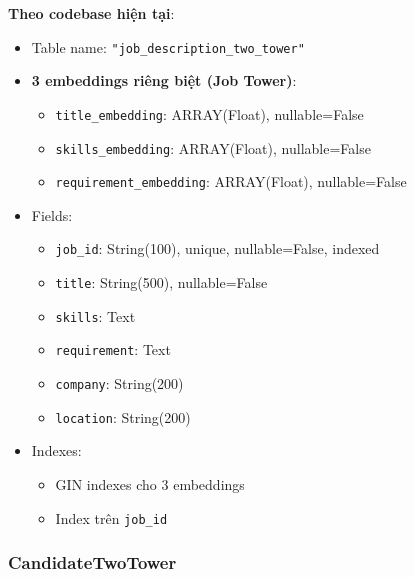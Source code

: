 \textbf{Theo codebase hiện tại}:
\begin{itemize}
    \item Table name: \texttt{"job\_description\_two\_tower"}
    \item \textbf{3 embeddings riêng biệt (Job Tower)}:
    \begin{itemize}
        \item \texttt{title\_embedding}: ARRAY(Float), nullable=False
        \item \texttt{skills\_embedding}: ARRAY(Float), nullable=False
        \item \texttt{requirement\_embedding}: ARRAY(Float), nullable=False
    \end{itemize}
    \item Fields:
    \begin{itemize}
        \item \texttt{job\_id}: String(100), unique, nullable=False, indexed
        \item \texttt{title}: String(500), nullable=False
        \item \texttt{skills}: Text
        \item \texttt{requirement}: Text
        \item \texttt{company}: String(200)
        \item \texttt{location}: String(200)
    \end{itemize}
    \item Indexes:
    \begin{itemize}
        \item GIN indexes cho 3 embeddings
        \item Index trên \texttt{job\_id}
    \end{itemize}
\end{itemize}

\subsubsection{CandidateTwoTower}

